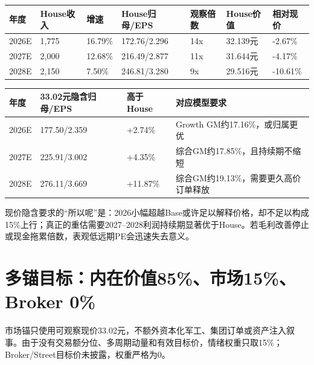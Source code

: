 \begin{exhibitbox}[市场预期估值桥]
\scriptsize
\begin{tabularx}{\exhibitboxwidth}{L{1.6cm}R{2.0cm}R{1.7cm}X C{1.8cm}R{2.1cm}R{1.9cm}}
\toprule
\textbf{年度} & \textbf{House收入} & \textbf{增速} & \textbf{House归母/EPS} & \textbf{观察倍数} & \textbf{House价值} & \textbf{相对现价} \\
\midrule
2026E & 1,775 & 16.79\% & 172.76/2.296 & 14x & 32.139元 & -2.67\% \\
2027E & 2,000 & 12.68\% & 216.49/2.877 & 11x & 31.644元 & -4.17\% \\
2028E & 2,150 & 7.50\% & 246.81/3.280 & 9x & 29.516元 & -10.61\% \\
\bottomrule
\end{tabularx}
\vspace{0.45em}
\begin{tabularx}{\exhibitboxwidth}{L{2.0cm}R{3.4cm}R{2.2cm}X}
\toprule
\textbf{年度} & \textbf{33.02元隐含归母/EPS} & \textbf{高于House} & \textbf{对应模型要求} \\
\midrule
2026E & 177.50/2.359 & +2.74\% & Growth GM约17.16\%，或归属更优 \\
2027E & 225.91/3.002 & +4.35\% & 综合GM约17.85\%，且持续期不缩短 \\
2028E & 276.11/3.669 & +11.87\% & 综合GM约19.13\%，需要更久高价订单释放 \\
\bottomrule
\end{tabularx}
\end{exhibitbox}

现价隐含要求的“所以呢”是：2026小幅超越Base或许足以解释价格，却不足以构成15\%上行；真正的重估需要2027--2028利润持续期显著优于House。若毛利改善停止或现金拖累倍数，表观低远期PE会迅速失去意义。

\section{多锚目标：内在价值85\%、市场15\%、Broker 0\%}

市场锚只使用可观察现价33.02元，不额外资本化军工、集团订单或资产注入叙事。由于没有交易额分位、多周期动量和有效目标价，情绪权重只取15\%；Broker/Street目标价未披露，权重严格为0。

